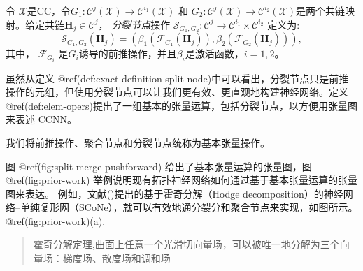 \documentclass[
  12pt,
]{krantz}
\begin{document}
\label{exact-definition-split-node}
令
\(\mathcal{X}\)是CC，令\(G_1\colon\mathcal{C}^{j}(\mathcal{X})\to\mathcal{C}^{i_1}(\mathcal{X})\)
和
\(G_2\colon\mathcal{C}^{j}(\mathcal{X})\to\mathcal{C}^{i_2}(\mathcal{X})\)是两个共链映射。给定共链\(\mathbf{H}_{j} \in \mathcal{C}^{j}\)，
\emph{分裂节点}操作
\(\mathcal{S}_{G_1,G_2}\colon\mathcal{C}^j \to \mathcal{C}^{i_1} \times \mathcal{C}^{i_2}\)
定义为: \begin{equation}
\mathcal{S}_{G_1,G_2}(\mathbf{H}_{j})= \left(  \beta_1(\mathcal{F}_{G_1}(\mathbf{H}_{j})) , \beta_2(\mathcal{F}_{G_2}(\mathbf{H}_{j})) \right),
\end{equation} 其中， \(\mathcal{F}_{G_i}\)
是\(G_i\)诱导的前推操作，并且\(\beta_i\)是激活函数，\(i=1, 2\)。

虽然从定义
@ref(def:exact-definition-split-node)中可以看出，分裂节点只是前推操作的元组，但使用分裂节点可以让我们更有效、更直观地构建神经网络。定义
@ref(def:elem-opers)提出了一组基本的张量运算，包括分裂节点，以方便用张量图来表述
CCNN。

\label{elem-opers}
我们将前推操作、聚合节点和分裂节点统称为基本张量操作。

图 @ref(fig:split-merge-pushforward) 给出了基本张量运算的张量图，图
@ref(fig:prior-work)
举例说明现有拓扑神经网络如何通过基于基本张量运算的张量图来表达。
例如，文献()提出的基于霍奇分解（Hodge
decomposition）的神经网络--单纯复形网（SCoNe），就可以有效地通分裂分和聚合节点来实现，如图所示。
@ref(fig:prior-work)(a).

\begin{quote}
霍奇分解定理,曲面上任意一个光滑切向量场，可以被唯一地分解为三个向量场：梯度场、散度场和调和场
\end{quote}
\end{document}
